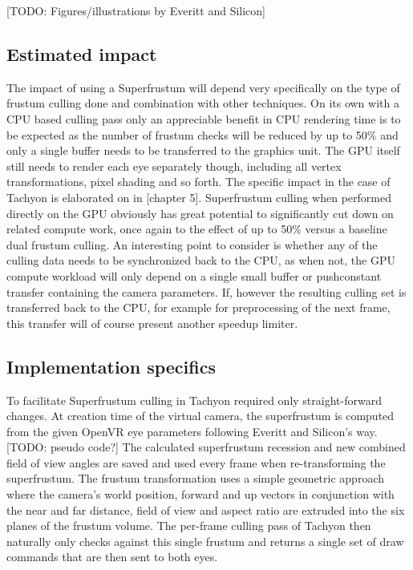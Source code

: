 [TODO: Figures/illustrations by Everitt and Silicon]

\subsection{Estimated impact}
The impact of using a Superfrustum will depend very specifically on the type of frustum culling done and combination with other techniques.
On its own with a CPU based culling pass only an appreciable benefit in CPU rendering time is to be expected as the number of frustum checks will be reduced by up to 50\% and only a single buffer needs to be transferred to the graphics unit. The GPU itself still needs to render each eye separately though, including all vertex transformations, pixel shading and so forth. The specific impact in the case of Tachyon is elaborated on in [chapter 5]. 
Superfrustum culling when performed directly on the GPU obviously has great potential to significantly cut down on related compute work, once again to the effect of up to 50\% versus a baseline dual frustum culling. An interesting point to consider is whether any of the culling data needs to be synchronized back to the CPU, as when not, the GPU compute workload will only depend on a single small buffer or pushconstant transfer containing the camera parameters. If, however the resulting culling set is transferred back to the CPU, for example for preprocessing of the next frame, this transfer will of course present another speedup limiter. 

\subsection{Implementation specifics}
To facilitate Superfrustum culling in Tachyon required only straight-forward changes. At creation time of the virtual camera, the superfrustum is computed from the given OpenVR eye parameters following Everitt and Silicon's way. 
[TODO: pseudo code?]
The calculated superfrustum recession and new combined field of view angles are saved and used every frame when re-transforming the superfrustum. The frustum transformation uses a simple geometric approach where the camera's world position, forward and up vectors in conjunction with the near and far distance, field of view and aspect ratio are extruded into the six planes of the frustum volume. 
The per-frame culling pass of Tachyon then naturally only checks against this single frustum and returns a single set of draw commands that are then sent to both eyes. 



